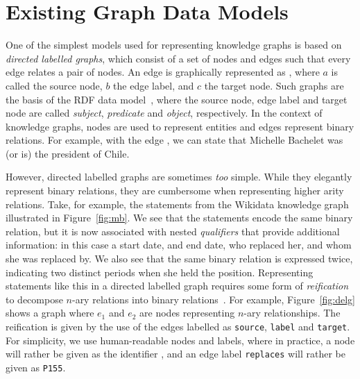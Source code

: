 

\section{Existing Graph Data Models}
\label{sec:existing}

One of the simplest models used for representing knowledge graphs is based on \textit{directed labelled graphs}, which consist of a set of nodes and edges such that every edge relates a pair of nodes. An edge is graphically represented as , where $a$ is called the source node, $b$ the edge label, and $c$ the target node. Such graphs are the basis of the RDF data model~\cite{CyganiakWL14}, where the source node, edge label and target node are called \textit{subject}, \textit{predicate} and \textit{object}, respectively. In the context of knowledge graphs, nodes are used to represent entities and edges represent binary relations. For example, with the edge , we can state that Michelle Bachelet was (or is) the president of Chile.

However, directed labelled graphs are sometimes \textit{too} simple. While they elegantly represent binary relations, they are cumbersome when representing higher arity relations. Take, for example, the statements from the Wikidata knowledge graph~\cite{VrandecicK14} illustrated in Figure~\ref{fig:mb}. We see that the statements encode the same binary relation, but it is now associated with nested \textit{qualifiers} that provide additional information: in this case a start date, and end date, who replaced her, and whom she was replaced by. We also see that the same binary relation is expressed twice, indicating two distinct periods when she held the position. Representing statements like this in a directed labelled graph requires some form of \textit{reification} to decompose $n$-ary relations into binary relations~\cite{HernandezHK15}. For example, Figure~\ref{fig:delg} shows a graph where $e_1$ and $e_2$ are nodes representing $n$-ary relationships. The reification is given by the use of the edges labelled as \texttt{source}, \texttt{label} and \texttt{target}. For simplicity, we use human-readable nodes and labels, where in practice, a node  will rather be given as the identifier , and an edge label \texttt{replaces} will rather be given as \texttt{P155}.

